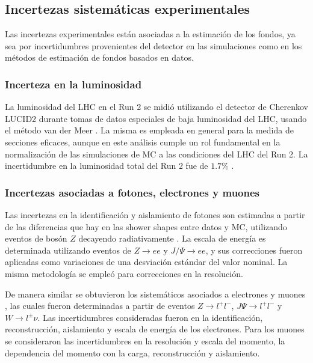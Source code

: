 \subsection{Incertezas sistemáticas experimentales}

Las incertezas experimentales están asociadas a la estimación de los fondos, ya sea por incertidumbres provenientes del detector en las simulaciones como en los métodos de estimación de fondos basados en datos.


\subsubsection{Incerteza en la luminosidad}

La luminosidad del LHC en el Run 2 se midió utilizando el detector de Cherenkov LUCID2 \cite{lucid2} durante tomas de datos especiales de baja luminosidad del LHC, usando el método van der Meer \cite{vandermeer1,vandermeer2}. La misma es empleada en general para la medida de secciones eficaces, aunque en este análisis cumple un rol fundamental en la normalización de las simulaciones de MC a las condiciones del LHC del Run 2. La incertidumbre en la luminosidad total del Run 2 fue de $1.7$\% \cite{ATLAS-CONF-2019-021}.


\subsubsection{Incertezas asociadas a fotones, electrones y muones}

Las incertezas en la identificación y aislamiento de fotones son estimadas a partir de las diferencias que hay en las shower shapes  entre datos y MC, utilizando eventos de bosón $Z$ decayendo radiativamente \cite{ph_unc1}. La escala de energía es determinada utilizando eventos de $Z\to ee$ y $J/\Psi \to ee$, y sus correcciones fueron aplicadas como variaciones de una desviación estándar del valor nominal. La misma metodología se empleó para correcciones en la resolución.

De manera similar se obtuvieron los sistemáticos asociados a electrones \cite{ATLAS-CONF-2014-032} y muones \cite{PERF-2015-10}, las cuales fueron determinadas a partir de eventos $Z\to l^+l^-$, $J\Psi\to l^+l^-$ y $W\to l^\pm \nu$. Las incertidumbres consideradas fueron en la identificación, reconstrucción, aislamiento y escala de energía de los electrones. Para los muones se consideraron las incertidumbres en la resolución y escala del momento, la dependencia del momento con la carga, reconstrucción y aislamiento.

